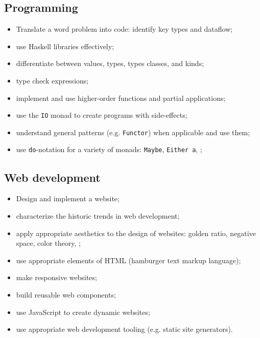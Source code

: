 \documentclass[11pt]{article}
\newcommand{\code}{\texttt}
\begin{document}
\subsection*{Programming}

\begin{itemize}
  \item Translate a word problem into code: identify key types and dataflow;
  \item use Haskell libraries effectively;
  \item differentiate between values, types, types classes, and kinds;
  \item type check expressions;
  \item implement and use higher-order functions and partial applications;
  \item use the \code{IO} monad to create programs with side-effects;
  \item understand general patterns (e.g. \code{Functor}) when applicable and
    use them;
  \item
    use \code{do}-notation for a variety of monads:
    \code{Maybe}, \code{Either a}, \textellipsis;
\end{itemize}

\subsection*{Web development}

\begin{itemize}
  \item Design and implement a website;
  \item characterize the historic trends in web development;
  \item apply appropriate aesthetics to the design of websites:
    golden ratio, negative space, color theory, \textellipsis;
  \item use appropriate elements of HTML (hamburger text markup language);
  \item make responsive websites;
  \item build reusable web components;
  \item use JavaScript to create dynamic websites;
  \item use appropriate web development tooling (e.g. static site generators).
\end{itemize}
\end{document}
